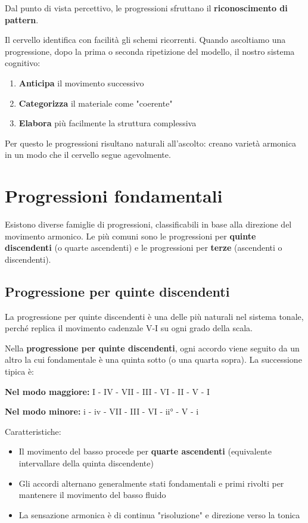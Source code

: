 \begin{fisica}
	Dal punto di vista percettivo, le progressioni sfruttano il \textbf{riconoscimento di pattern}. 
	
	Il cervello identifica con facilità gli schemi ricorrenti. Quando ascoltiamo una progressione, dopo la prima o seconda ripetizione del modello, il nostro sistema cognitivo:
	\begin{enumerate}
		\item \textbf{Anticipa} il movimento successivo
		\item \textbf{Categorizza} il materiale come "coerente"
		\item \textbf{Elabora} più facilmente la struttura complessiva
	\end{enumerate}
	
	Per questo le progressioni risultano naturali all'ascolto: creano varietà armonica in un modo che il cervello segue agevolmente.
\end{fisica}

\section{Progressioni fondamentali}
\label{sec:progressioni_fondamentali}

Esistono diverse famiglie di progressioni, classificabili in base alla direzione del movimento armonico. Le più comuni sono le progressioni per \textbf{quinte discendenti} (o quarte ascendenti) e le progressioni per \textbf{terze} (ascendenti o discendenti).

\subsection{Progressione per quinte discendenti}
\label{subsec:progressione_quinte}

La progressione per quinte discendenti è una delle più naturali nel sistema tonale, perché replica il movimento cadenzale V-I su ogni grado della scala.

\begin{regola}
	\label{reg:progressione_quinte_disc}
	Nella \textbf{progressione per quinte discendenti}, ogni accordo viene seguito da un altro la cui fondamentale è una quinta sotto (o una quarta sopra). La successione tipica è:
	
	\textbf{Nel modo maggiore:}
	I - IV - VII - III - VI - II - V - I
	
	\textbf{Nel modo minore:}
	i - iv - VII - III - VI - ii° - V - i
	
	Caratteristiche:
	\begin{itemize}
		\item Il movimento del basso procede per \textbf{quarte ascendenti} (equivalente intervallare della quinta discendente)
		\item Gli accordi alternano generalmente stati fondamentali e primi rivolti per mantenere il movimento del basso fluido
		\item La sensazione armonica è di continua "risoluzione" e direzione verso la tonica
	\end{itemize}
\end{regola}

